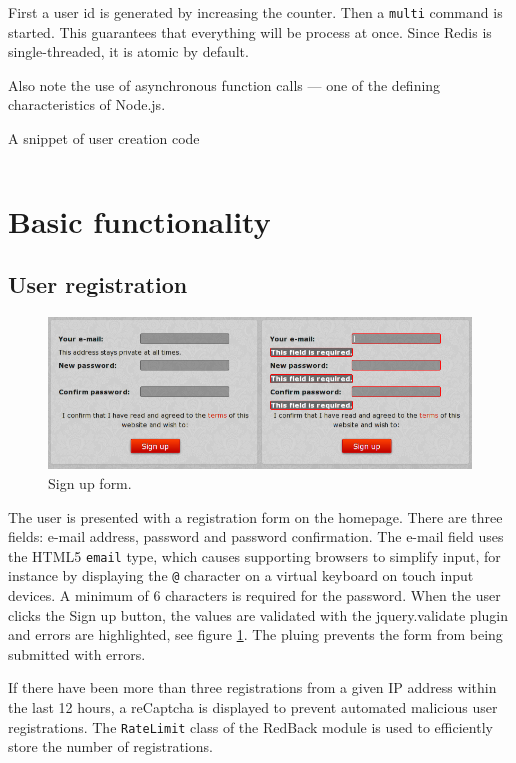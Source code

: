 \documentclass[12pt,oneside]{fithesis}
\begin{document}
	First a user id is generated by increasing the counter. Then a \texttt{multi} command is started. This guarantees that everything will be process at once. Since Redis is single-threaded, it is atomic by default.
	
	Also note the use of asynchronous function calls --- one of the defining characteristics of Node.js.
	\begin{program}[h!]
	\caption{A snippet of user creation code}
	\label{code:ex-user}
	\inputminted[fontsize=\footnotesize, linenos=false]{javascript}{ex-user.js}
	\end{program}
	
	
\section{Basic functionality}
	\subsection{User registration}	
	  \begin{figure}[h]
	  \centering
	    \includegraphics[width=1.0\textwidth]{screen-signup.png}
		  \caption{Sign up form.}
		  \label{fig:screen-signup}
	  \end{figure}
		The user is presented with a registration form on the homepage. There are three fields: e-mail address, password and password confirmation. The e-mail field uses the HTML5 \texttt{email} type, which causes supporting browsers to simplify input, for instance by displaying the \texttt{@} character on a virtual keyboard on touch input devices. A minimum of 6 characters is required for the password. When the user clicks the Sign up button, the values are validated with the jquery.validate plugin and errors are highlighted, see figure \ref{fig:screen-signup}. The pluing prevents the form from being submitted with errors.
		
		If there have been more than three registrations from a given IP address within the last 12 hours, a reCaptcha is displayed to prevent automated malicious user registrations. The \texttt{RateLimit} class of the RedBack module is used to efficiently store the number of registrations.
		
\end{document}
